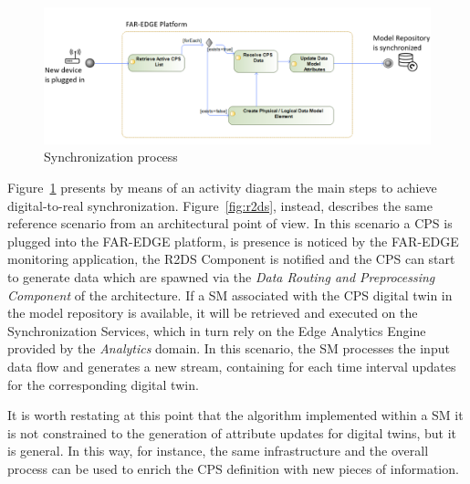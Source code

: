 \begin{figure}
	\centering
	\includegraphics[width=\linewidth]{images/sm-scenario2}
	\caption{Synchronization process}
	\label{fig:sm-scenario}
\end{figure}

Figure~\ref{fig:sm-scenario} presents by means of an activity diagram the main steps to achieve digital-to-real synchronization. Figure~\ref{fig:r2ds}, instead, describes the same reference scenario from an architectural point of view. In this scenario a CPS is plugged into the FAR-EDGE platform, is presence is noticed by the FAR-EDGE monitoring application, the R2DS Component is notified and the CPS can start to generate data which are spawned via the \textit{Data Routing and Preprocessing Component} of the architecture. 
If a SM associated with the CPS digital twin in the model repository is available, it will be retrieved and executed on the Synchronization Services, which in turn rely on the Edge Analytics Engine provided by the \textit{Analytics} domain. 
In this scenario, the SM processes the input data flow and generates a new stream, containing for each time interval updates for the corresponding digital twin. 

It is worth restating at this point that the algorithm implemented within a SM it is not constrained to the generation of attribute updates for digital twins, but it is general. In this way, for instance, the same infrastructure and the overall process can be used to enrich the CPS definition with new pieces of information. 

